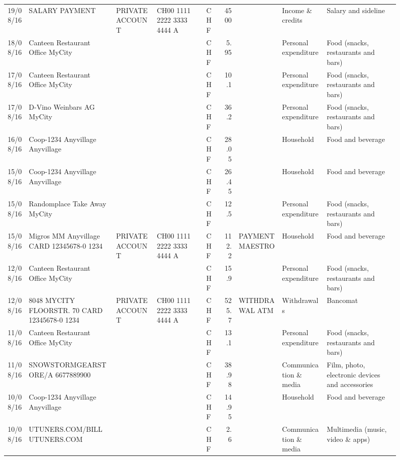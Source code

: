 \begin{landscape}
\begin{sidewaysfigure}
\begin{table}[h]
\begin{center}
\begin{tabular}{rllllrlll}
		19/08/16 & SALARY PAYMENT & PRIVATE ACCOUNT & CH00 1111 2222 3333 4444 A & CHF   & 4500  &       & Income \& credits & Salary and sideline \\
		18/08/16 & Canteen Restaurant Office      MyCity &       &       & CHF   & 5.95  &       & Personal expenditure & Food (snacks, restaurants and bars) \\
		17/08/16 & Canteen Restaurant Office      MyCity &       &       & CHF   & 10.1  &       & Personal expenditure & Food (snacks, restaurants and bars) \\
		17/08/16 & D-Vino Weinbars AG       MyCity &       &       & CHF   & 36.2  &       & Personal expenditure & Food (snacks, restaurants and bars) \\
		16/08/16 & Coop-1234 Anyvillage    Anyvillage &       &       & CHF   & 28.05 &       & Household & Food and beverage \\
		15/08/16 & Coop-1234 Anyvillage    Anyvillage &       &       & CHF   & 26.45 &       & Household & Food and beverage \\
		15/08/16 & Randomplace Take Away     MyCity &       &       & CHF   & 12.5  &       & Personal expenditure & Food (snacks, restaurants and bars) \\
		15/08/16 & Migros MM Anyvillage CARD 12345678-0 1234 & PRIVATE ACCOUNT & CH00 1111 2222 3333 4444 A & CHF   & 112.2 & PAYMENT MAESTRO & Household & Food and beverage \\
		12/08/16 & Canteen Restaurant Office      MyCity &       &       & CHF   & 15.9  &       & Personal expenditure & Food (snacks, restaurants and bars) \\
		12/08/16 & 8048 MYCITY FLOORSTR. 70 CARD 12345678-0 1234 & PRIVATE ACCOUNT & CH00 1111 2222 3333 4444 A & CHF   & 525.7 & WITHDRAWAL ATM & Withdrawals & Bancomat \\
		11/08/16 & Canteen Restaurant Office      MyCity &       &       & CHF   & 13.1  &       & Personal expenditure & Food (snacks, restaurants and bars) \\
		11/08/16 & SNOWSTORMGEARSTORE/A      6677889900 &       &       & CHF   & 38.98 &       & Communication \& media & Film, photo, electronic devices and accessories \\
		10/08/16 & Coop-1234 Anyvillage    Anyvillage &       &       & CHF   & 14.95 &       & Household & Food and beverage \\
		10/08/16 & UTUNERS.COM/BILL          UTUNERS.COM &       &       & CHF   & 2.6   &       & Communication \& media & Multimedia (music, video \& apps) \\

\end{tabular}
\end{center}
\end{table}
\end{sidewaysfigure}
\end{landscape}
